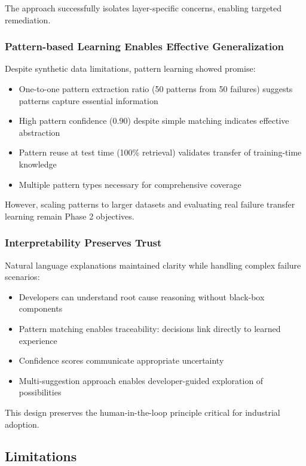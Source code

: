 \documentclass[11pt]{article}
\begin{document}
The approach successfully isolates layer-specific concerns, enabling targeted remediation.

\subsubsection{Pattern-based Learning Enables Effective Generalization}

Despite synthetic data limitations, pattern learning showed promise:

\begin{itemize}
    \item One-to-one pattern extraction ratio (50 patterns from 50 failures) suggests patterns capture essential information
    \item High pattern confidence (0.90) despite simple matching indicates effective abstraction
    \item Pattern reuse at test time (100\% retrieval) validates transfer of training-time knowledge
    \item Multiple pattern types necessary for comprehensive coverage
\end{itemize}

However, scaling patterns to larger datasets and evaluating real failure transfer learning remain Phase 2 objectives.

\subsubsection{Interpretability Preserves Trust}

Natural language explanations maintained clarity while handling complex failure scenarios:

\begin{itemize}
    \item Developers can understand root cause reasoning without black-box components
    \item Pattern matching enables traceability: decisions link directly to learned experience
    \item Confidence scores communicate appropriate uncertainty
    \item Multi-suggestion approach enables developer-guided exploration of possibilities
\end{itemize}

This design preserves the human-in-the-loop principle critical for industrial adoption.

\subsection{Limitations}
\end{document}
